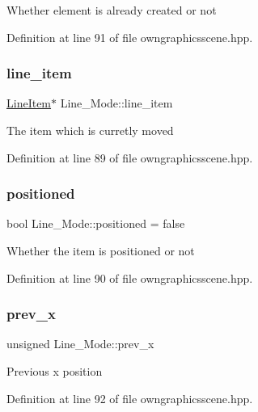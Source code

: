 Whether element is already created or not 

Definition at line 91 of file owngraphicsscene.\+hpp.

\mbox{\label{structLine__Mode_a4e11b31f28505579f3dfcde54b27ecac}} 
\subsubsection{\texorpdfstring{line\+\_\+item}{line\_item}}
{\footnotesize\ttfamily \mbox{\hyperlink{classLineItem}{Line\+Item}}$\ast$ Line\+\_\+\+Mode\+::line\+\_\+item}

The item which is curretly moved 

Definition at line 89 of file owngraphicsscene.\+hpp.

\mbox{\label{structLine__Mode_aefbb8555f406d47d742491003a6afde1}} 
\subsubsection{\texorpdfstring{positioned}{positioned}}
{\footnotesize\ttfamily bool Line\+\_\+\+Mode\+::positioned = false}

Whether the item is positioned or not 

Definition at line 90 of file owngraphicsscene.\+hpp.

\mbox{\label{structLine__Mode_a8bbcbaff29a7810e066e99174e562371}} 
\subsubsection{\texorpdfstring{prev\+\_\+x}{prev\_x}}
{\footnotesize\ttfamily unsigned Line\+\_\+\+Mode\+::prev\+\_\+x}

Previous x position 

Definition at line 92 of file owngraphicsscene.\+hpp.

\mbox{\label{structLine__Mode_a8d5fb940f686955ead3f368a8d3b9016}} 
